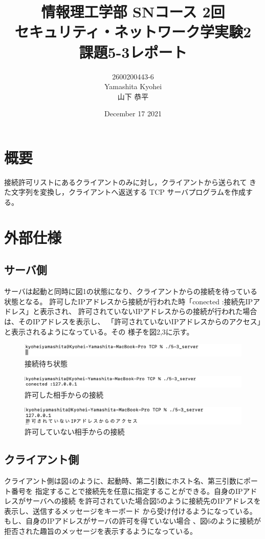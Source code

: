 \documentclass[dvipdfmx,autodetect-engine,titlepage]{jsarticle}
\title{情報理工学部 SNコース 2回\\
セキュリティ・ネットワーク学実験2\\
課題5-3レポート}
\author{2600200443-6\\Yamashita Kyohei\\山下 恭平}
\date{December 17 2021}
\begin{document}
\maketitle

\section{概要}
接続許可リストにあるクライアントのみに対し，クライアントから送られて
きた文字列を変換し，クライアントへ返送する TCP サーバプログラムを作成する。


\section{外部仕様}

\subsection{サーバ側}
サーバは起動と同時に図1の状態になり、クライアントからの接続を待っている状態となる。
許可したIPアドレスから接続が行われた時「conected :接続先IPアドレス」と表示され、
許可されていないIPアドレスからの接続が行われた場合は、そのIPアドレスを表示し、
「許可されていないIPアドレスからのアクセス」と表示されるようになっている。その
様子を図2,3に示す。
\begin{figure}[h]
    \centering
    \includegraphics[scale=1]{pic11.png}
    \caption{接続待ち状態}
  \end{figure}

\begin{figure}[h]
    \centering
    \includegraphics[scale=1]{pic7.png}
    \caption{許可した相手からの接続}
  \end{figure}

  \begin{figure}[h]
    \centering
    \includegraphics[scale=1]{pic9.png}
    \caption{許可していない相手からの接続}
  \end{figure}


\subsection{クライアント側}
クライアント側は図4のように、起動時、第二引数にホスト名、第三引数にポート番号を
指定することで接続先を任意に指定することができる。自身のIPアドレスがサーバへの接続
を許可されていた場合図5のように接続先のIPアドレスを表示し、送信するメッセージをキーボード
から受け付けるようになっている。もし、自身のIPアドレスがサーバの許可を得ていない場合
、図6のように接続が拒否された趣旨のメッセージを表示するようになっている。
\end{document}
